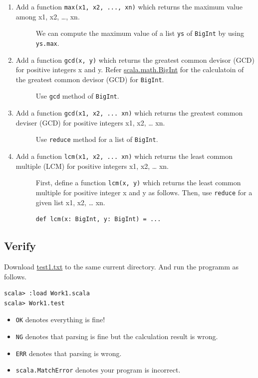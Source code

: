\documentclass[11pt]{article}
\begin{document}
\begin{enumerate}
\item Add a function  \texttt{max(x1, x2, ..., xn)} which returns the maximum
value among x1, x2, \ldots{}, xn. 
\begin{description}
\item[{}] We can compute the maximum value of a list \texttt{ys} of \texttt{BigInt} by
using \texttt{ys.max}.
\end{description}
\item Add a function \texttt{gcd(x, y)} which returns the greatest common
devisor (GCD) for positive integers x and y. 
Refer \href{http://www.scala-lang.org/api/current/scala/math/BigInt.html}{scala.math.BigInt} for the calculatoin of the greatest common
devisor (GCD) for \texttt{BigInt}. 
\begin{description}
\item[{}] Use  \texttt{gcd} method of \texttt{BigInt}.
\end{description}
\item Add a function \texttt{gcd(x1, x2, ... xn)} which returns the greatest
common deviser (GCD) for positive integers x1, x2, \ldots{} xn. 
\begin{description}
\item[{}] Use \texttt{reduce} method for a list of  \texttt{BigInt}.
\end{description}
\item Add a function \texttt{lcm(x1, x2, ... xn)} which returns the least common
multiple (LCM) for positive integers  x1, x2, \ldots{} xn. 
\begin{description}
\item[{}] First, define a function \texttt{lcm(x, y)} which returns the least common
multiple for positive integer x and y as follows. Then, use
\texttt{reduce} for a given list x1, x2, \ldots{} xn. 
\begin{verbatim}
def lcm(x: BigInt, y: BigInt) = ...
\end{verbatim}
\end{description}
\end{enumerate}

\subsection{Verify}
\label{sec:orgheadline12}
Download \href{prog/parser/test1.txt}{test1.txt} to the same current directory. And run the programm
as follows. 

\begin{verbatim}
scala> :load Work1.scala
scala> Work1.test
\end{verbatim}

\begin{itemize}
\item \texttt{OK} denotes everything is fine!
\item \texttt{NG} denotes that parsing is fine but the calculation result is wrong.
\item \texttt{ERR} denotes that parsing is wrong.
\item \texttt{scala.MatchError} denotes your program is incorrect.
\end{itemize}
\end{document}
